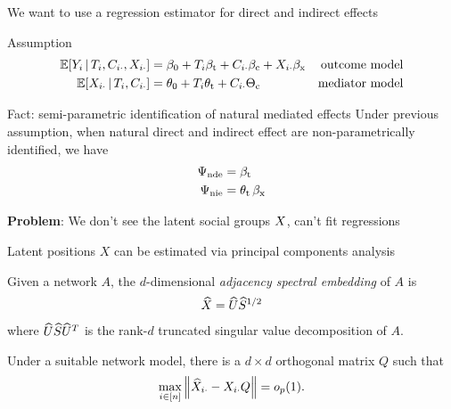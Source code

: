 \documentclass[aspectratio=169]{beamer}
\theoremstyle{remark}
\begin{document}
\begin{frame}{We want to use a regression estimator for direct and indirect effects}
    \begin{block}{Assumption}
        \begin{equation*}
            \begin{aligned}
                \E[T_i, C_{i \cdot}, \X_{i \cdot}]{Y_i}
                 & = \betazero + T_i \betat + C_{i \cdot} \betac + \X_{i \cdot} \betax
                 & \text{outcome model}                                                \\
                \E[T_i, C_{i \cdot}]{\X_{i \cdot}}
                 & = \thetazero + T_i \thetat + C_{i \cdot} \Thetac
                 & \text{mediator model}
            \end{aligned}
        \end{equation*}
    \end{block}
    \begin{block}{Fact: semi-parametric identification of natural mediated effects}
        Under previous assumption, when natural direct and indirect effect are non-parametrically identified, we have
        \begin{equation*}
            \begin{aligned}
                \Psi_\mathrm{nde} & = \beta_\text{t}            \\
                \Psi_\mathrm{nie} & = \theta_\text{t} \, \beta_\text{x}
            \end{aligned}
        \end{equation*}
    \end{block}
    \centering
    \textbf{Problem}: We don't see the latent social groups $X$, can't fit regressions
\end{frame}

\begin{frame}{Latent positions $X$ can be estimated via principal components analysis}
    \begin{definition}[ASE]
        Given a network $A$, the $d$-dimensional \emph{adjacency spectral embedding} of $A$ is
        \begin{align*}
            \widehat{X} = \widehat{U} \widehat{S}^{1/2}
        \end{align*}
        \noindent where $\widehat{U} \widehat{S} \widehat{U}^T$ is the rank-$d$ truncated singular value decomposition of $A$.
    \end{definition}
    \begin{lemma}
        Under a suitable network model, there is a $d \times d$ orthogonal matrix $Q$ such that
        \begin{equation*}
            \max_{i \in [n]} \, \norm*{\Xhat_{i \cdot} - \X_{i \cdot} Q} = \op{1}.
        \end{equation*}
    \end{lemma}
\end{frame}
\end{document}
